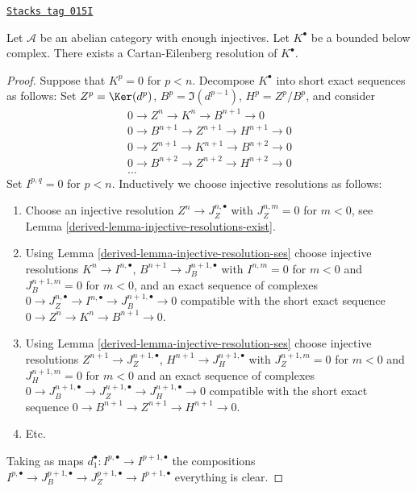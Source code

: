 \begin{lemma}
\label{derived-lemma-cartan-eilenberg}
\href{https://stacks.math.columbia.edu/tag/015I}{\texttt{Stacks tag 015I}}

Let $\mathcal{A}$ be an abelian category with enough injectives.
Let $K^\bullet$ be a bounded below complex.
There exists a Cartan-Eilenberg resolution of $K^\bullet$.
\end{lemma}

\begin{proof}

Suppose that $K^p = 0$ for $p < n$. Decompose $K^\bullet$ into
short exact sequences as follows: Set $Z^p = \Ker(d^p)$,
$B^p = \Im(d^{p - 1})$, $H^p = Z^p/B^p$, and consider
$$
\begin{matrix}
0 \to Z^n \to K^n \to B^{n + 1} \to 0 \\
0 \to B^{n + 1} \to Z^{n + 1} \to H^{n + 1} \to 0 \\
0 \to Z^{n + 1} \to K^{n + 1} \to B^{n + 2} \to 0 \\
0 \to B^{n + 2} \to Z^{n + 2} \to H^{n + 2} \to 0 \\
\ldots
\end{matrix}
$$
Set $I^{p, q} = 0$ for $p < n$. Inductively we choose
injective resolutions as follows:
\begin{enumerate}
\item Choose an injective resolution $Z^n \to J_Z^{n, \bullet}$
with $J_Z^{n, m} = 0$ for $m < 0$, see
Lemma \ref{derived-lemma-injective-resolutions-exist}.
\item Using Lemma \ref{derived-lemma-injective-resolution-ses} choose injective
resolutions $K^n \to I^{n, \bullet}$, $B^{n + 1} \to J_B^{n + 1, \bullet}$
with $I^{n, m} = 0$ for $m < 0$ and $J_B^{n + 1, m} = 0$ for $m < 0$,
and an exact sequence of complexes
$0 \to J_Z^{n, \bullet} \to I^{n, \bullet} \to J_B^{n + 1, \bullet} \to 0$
compatible with the short exact sequence
$0 \to Z^n \to K^n \to B^{n + 1} \to 0$.
\item Using Lemma \ref{derived-lemma-injective-resolution-ses} choose injective
resolutions $Z^{n + 1} \to J_Z^{n + 1, \bullet}$,
$H^{n + 1} \to J_H^{n + 1, \bullet}$
with $J_Z^{n + 1, m} = 0$ for $m < 0$ and $J_H^{n + 1, m} = 0$ for $m < 0$
and an exact sequence of complexes
$0 \to J_B^{n + 1, \bullet} \to J_Z^{n + 1, \bullet}
\to J_H^{n + 1, \bullet} \to 0$
compatible with the short exact sequence
$0 \to B^{n + 1} \to Z^{n + 1} \to H^{n + 1} \to 0$.
\item Etc.
\end{enumerate}
Taking as maps $d_1^\bullet : I^{p, \bullet} \to I^{p + 1, \bullet}$
the compositions
$I^{p, \bullet} \to J_B^{p + 1, \bullet} \to
J_Z^{p + 1, \bullet} \to I^{p + 1, \bullet}$ everything is clear.
\end{proof}

